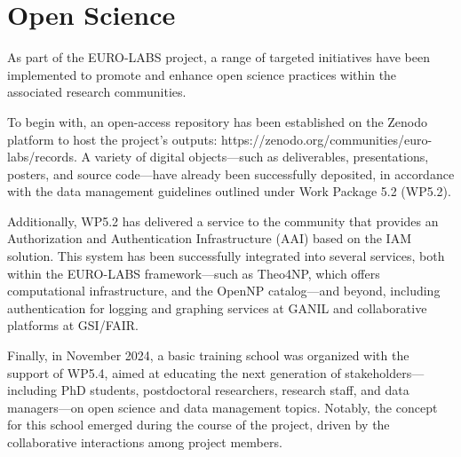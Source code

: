 %
\clearpage
\section{Open Science}
As part of the EURO-LABS project, a range of targeted initiatives have been implemented to promote and enhance open science practices within the associated research communities.

To begin with, an open-access repository has been established on the Zenodo platform to host the project’s outputs: https://zenodo.org/communities/euro-labs/records. A variety of digital objects—such as deliverables, presentations, posters, and source code—have already been successfully deposited, in accordance with the data management guidelines outlined under Work Package 5.2 (WP5.2).

Additionally, WP5.2 has delivered a service to the community that provides an Authorization and Authentication Infrastructure (AAI) based on the IAM solution. This system has been successfully integrated into several services, both within the EURO-LABS framework—such as Theo4NP, which offers computational infrastructure, and the OpenNP catalog—and beyond, including authentication for logging and graphing services at GANIL and collaborative platforms at GSI/FAIR.

Finally, in November 2024, a basic training school was organized with the support of WP5.4, aimed at educating the next generation of stakeholders—including PhD students, postdoctoral researchers, research staff, and data managers—on open science and data management topics. Notably, the concept for this school emerged during the course of the project, driven by the collaborative interactions among project members.